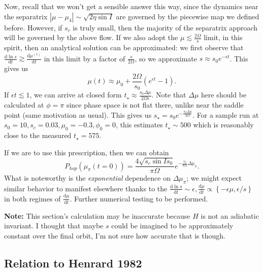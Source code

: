 \documentclass[11pt,
        usenames, %
        dvipsnames %
    ]{article}
\newcommand*{\rd}[2]{\frac{\mathrm{d}#1}{\mathrm{d}#2}}
\newcommand*{\abs}[1]{\left|#1\right|}
\newcommand*{\p}[1]{\left(#1\right)}
\newcommand*{\z}[1]{\left\{#1\right\}}
\begin{document}
Now, recall that we won't get a sensible answer this way, since the dynamics
near the separatrix $\abs{\mu - \mu_4} \sim \sqrt{2\eta \sin I}$ are governed
by the piecewise map we defined before. However, if $s_c$ is truly small, then
the majority of the separatrix approach will be governed by the above flow. If
we also adopt the $\mu \lesssim \frac{2\Omega}{s}$ limit, in this spirit, then
an analytical solution can be approximated: we first observe that $\rd{\ln s}{t}
\gtrsim \rd{\mu^{(1)}}{t}$ in this limit by a factor of $\frac{s}{2\Omega}$, so
we approximate $s \approx s_0e^{-\epsilon t}$. This gives us
\begin{equation*}
    \mu(t) \approx \mu_0 + \frac{2\Omega}{s_0}\p{e^{\epsilon t} - 1}.
\end{equation*}
If $\epsilon t \lesssim 1$, we can arrive at closed form $t_\star \approx
\frac{s_0 \Delta \mu}{2\Omega \epsilon}$. Note that $\Delta \mu$ here should be
calculated at $\phi = \pi$ since phase space is not flat there, unlike near the
saddle point (same motivation as usual). This gives us $s_\star = s_0
e^{-\frac{s_0 \Delta \mu}{2\Omega}}$. For a sample run at $s_0 = 10, s_c =
0.03, \mu_0 = -0.3, \phi_0 = 0$, this estimates $t_\star \sim 500$ which is
reasonably close to the measured $t_\star = 575$.

If we are to use this prescription, then we can obtain
\begin{equation}
    P_{hop}\p{\mu_\pi(t = 0)}
        = \frac{4\sqrt{s_c \sin I s_0}}{\pi \Omega}
            e^{-\frac{s_0}{4\Omega}\Delta \mu_\pi}.
\end{equation}
What is noteworthy is the \emph{exponential} dependence on $\Delta \mu_\pi$; we
might expect similar behavior to manifest elsewhere thanks to the $\rd{\ln s}{t}
\sim \epsilon, \rd{\mu}{t} \propto \z{-\epsilon \mu, \epsilon/s}$ in both
regimes of $\rd{\mu}{t}$. Further numerical testing to be performed.

\textbf{Note:} This section's calculation may be inaccurate because $H$ is not
an adiabatic invariant. I thought that maybe $s$ could be imagined to be
approximately constant over the final orbit, I'm not sure how accurate that is
though.

\subsection{Relation to Henrard 1982}
\end{document}
